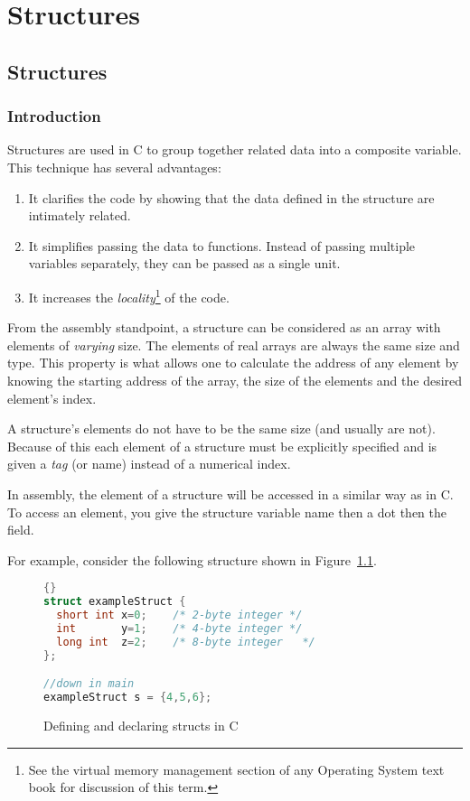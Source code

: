 \chapter{Structures}

\section{Structures}

\subsection{Introduction}

Structures are used in C to group together related data into a composite 
variable. This technique has several advantages:
\begin{enumerate}
\item It clarifies the code by showing that the data defined in the structure
      are intimately related.
\item It simplifies passing the data to functions. Instead of passing
      multiple variables separately, they can be passed as a single unit.
\item It increases the \emph{locality}\footnote{See the virtual memory 
management section of any Operating System text book for discussion of
this term.} of the code.
\end{enumerate}

From the assembly standpoint, a structure can be considered as an
array with elements of \emph{varying} size. The elements of real
arrays are always the same size and type. This property is what allows
one to calculate the address of any element by knowing the starting
address of the array, the size of the elements and the desired
element's index.

A structure's elements do not have to be the same size (and usually
are not). Because of this each element of a structure must be
explicitly specified and is given a \emph{tag} (or name) instead of a
numerical index.

In assembly, the element of a structure will be accessed in a similar
way as in C.  To access an element, you give the structure variable name
then a dot then the field.  

For example, consider the following structure shown in Figure~\ref{fig:CStructs}.
\begin{figure}[t]
\begin{lstlisting}[language=C,stepnumber=0]{}
struct exampleStruct {
  short int x=0;    /* 2-byte integer */
  int       y=1;    /* 4-byte integer */
  long int  z=2;    /* 8-byte integer   */
};

//down in main
exampleStruct s = {4,5,6};
\end{lstlisting}
\caption{Defining and declaring structs in C\label{fig:CStructs}}
\end{figure}

